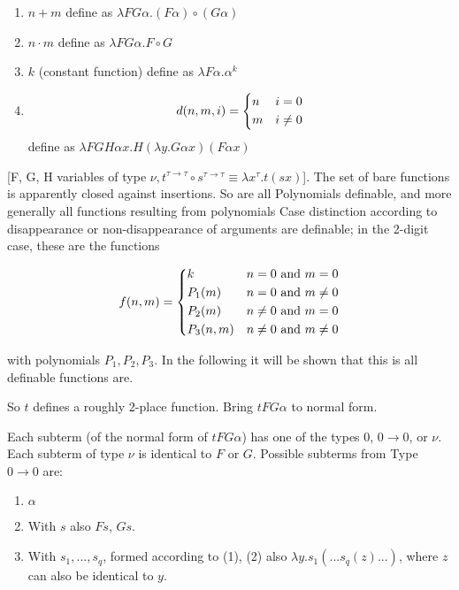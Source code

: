 \documentclass[11pt]{article}
\begin{document}
\begin{enumerate}
    \item \(n + m\) define as \(\lambda F G \alpha. (F \alpha) \circ (G \alpha)\)
    \item \(n \cdot m\) define as \(\lambda F G \alpha. F \circ G\)
    \item \(k\) (constant function) define as \(\lambda F \alpha . \alpha ^ k\)
    \item \[ d(n, m, i) =
        \begin{dcases}
            n & i = 0 \\
            m & i \neq 0 \\
        \end{dcases}
    \] define as \(\lambda F G H \alpha x. H(\lambda y. G \alpha x) (F \alpha x)\)
\end{enumerate}

[F, G, H variables of type \(\nu, t^{\tau \rightarrow \tau} \circ s^{\tau \rightarrow \tau} \equiv \lambda x^\tau. t(s x)\)]. The set of
bare functions is apparently closed against insertions. So are all Polynomials definable, and more generally all functions resulting from polynomials Case distinction according to disappearance or non-disappearance of arguments
are definable; in the 2-digit case, these are the functions

\[ f(n, m) =
        \begin{dcases}
            k & n = 0 \text{ and } m = 0 \\
            P_1(m) & n = 0 \text{ and } m \neq 0 \\
            P_2(m) & n \neq 0 \text{ and } m = 0 \\
            P_3(n, m) & n \neq 0 \text{ and } m \neq 0 \\
        \end{dcases}
\]

with polynomials \(P_1, P_2, P_3\). In the following it will be shown that this is all definable functions are.

So \(t\) defines a roughly 2-place function. Bring \(t F G \alpha\) to normal form.

Each subterm (of the normal form of \(t F G \alpha\)) has one of the types $0$, $0 \rightarrow 0$, or \(\nu\). Each subterm of type \(\nu\) is identical to $F$ or $G$. Possible subterms from Type \(0 \rightarrow 0\) are:

\begin{enumerate}
    \item \(\alpha\)
    \item With $s$ also $Fs$, $Gs$.
    \item With \(s_1, ..., s_q\), formed according to (1), (2) also \(\lambda y. s_1 (... s_q(z)...)\), where $z$ can also be identical to $y$.
\end{enumerate}
\end{document}

